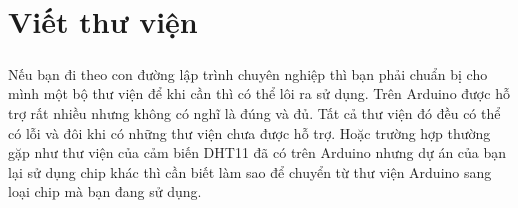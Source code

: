 \documentclass[12pt,a5paper]{book}
\begin{document}

\chapter{Viết thư viện}
\paragraph{}
Nếu bạn đi theo con đường lập trình chuyên nghiệp thì bạn phải chuẩn bị cho mình một bộ thư viện để khi cần thì có thể lôi ra sử dụng. Trên Arduino được hỗ trợ rất nhiều nhưng không có nghĩ là đúng và  đủ. Tất cả thư viện đó đều có thể có lỗi và đôi khi có những thư viện chưa được hỗ trợ. Hoặc trường hợp thường gặp như thư viện của cảm biến DHT11 đã có trên Arduino nhưng dự án của bạn lại sử dụng chip khác thì cần biết làm sao để chuyển từ thư viện Arduino sang loại chip mà bạn đang sử dụng.
\end{document}
